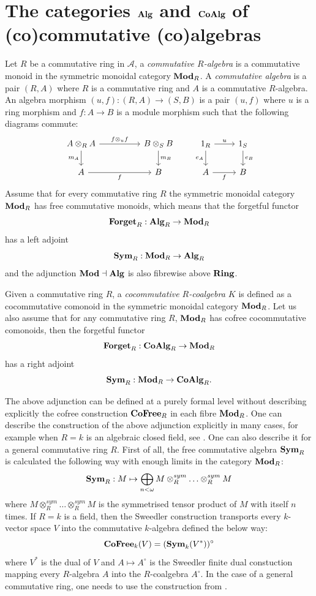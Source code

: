 \documentclass[8pt]{article}
\theoremstyle{definition}
\theoremstyle{definition}
\theoremstyle{definition}
\theoremstyle{definition}
\theoremstyle{definition}
\theoremstyle{definition}
\theoremstyle{definition}
\theoremstyle{definition}
\theoremstyle{definition}
\theoremstyle{definition}
\theoremstyle{definition}
\theoremstyle{definition}
\theoremstyle{definition}
\theoremstyle{definition}
\theoremstyle{question}
\begin{document}
\section{The categories ${\bf Alg}$ and ${\bf CoAlg}$ of (co)commutative (co)algebras}

Let $R$ be a commutative ring in $\mathcal{A}$, a \emph{commutative $R$-algebra} is a commutative monoid in the symmetric monoidal category
${\bf Mod}_R$. A \emph{commutative algebra} is a pair $(R, A)$ where $R$ is a commutative ring and $A$ is a commutative $R$-algebra.
An algebra morphism $(u, f) : (R, A) \to (S, B)$ is a pair $(u, f)$ where $u$ is a ring morphism and $f : A \to B$ is a module morphism such that the 
following diagrams commute:
\[
\begin{tikzcd}
  A \otimes_R A \ar[d, "m_A"'] \ar[rr, "f \otimes_u f"] && B \otimes_S B \ar[d, "m_B"] & 1_R \ar[r, "u"] \ar[d, "e_A"'] & 1_S \ar[d, "e_B"] \\
  A \ar[rr, "f"'] && B                                                                 & A \ar[r, "f"'] & B
\end{tikzcd}
\]
Assume that for every commutative ring $R$ the symmetric monoidal category ${\bf Mod}_R$ has free commutative monoids, which means that the forgetful 
functor
\[
{\bf Forget}_R : {\bf Alg}_R \to {\bf Mod}_R
\]
has a left adjoint
\[
{\bf Sym}_R : {\bf Mod}_R \to {\bf Alg}_R
\]
and the adjunction ${\bf Mod} \dashv {\bf Alg}$ is also fibrewise above ${\bf Ring}$.

Given a commutative ring $R$, a \emph{cocommutative $R$-coalgebra $K$} is defined as a cocommutative comonoid in the symmetric monoidal category
${\bf Mod}_R$. Let us also assume that for any commutative ring $R$, ${\bf Mod}_R$ has cofree cocommutative comonoids, then the forgetful functor
\[
{\bf Forget}_R : {\bf CoAlg}_R \to {\bf Mod}_R
\]
has a right adjoint  
\[
{\bf Sym}_R : {\bf Mod}_R \to {\bf CoAlg}_R.
\]
 
The above adjunction can be defined at a purely formal level without describing explicitly the cofree 
construction ${\bf CoFree}_R$ in each fibre ${\bf Mod}_R$. One can describe the construction of the above adjunction explicitly in many cases, for example when $R = k$ is an algebraic closed field, see \cite{murfet2015sweedler}.
One can also describe it for a general commutative ring $R$. First of all, the free commutative algebra ${\bf Sym}_R$ is calculated the following way
with enough limits in the category ${\bf Mod}_R$:
\[
{\bf Sym}_R : M \mapsto \bigoplus \limits_{n < \omega} M \otimes^{sym}_R \ldots \otimes^{sym}_R M
\]
where $M \otimes^{sym}_R \ldots \otimes^{sym}_R M$ is the symmetrised tensor product of $M$ with itself $n$ times. If $R = k$ is a field,
then the Sweedler construction transports every $k$-vector space $V$ into the commutative $k$-algebra defined the below way:
\[
{\bf CoFree}_k(V) = ({\bf Sym}_k(V^*))^{\circ}
\]
where $V^*$ is the dual of $V$ and $A \mapsto A^{\circ}$ is the Sweedler finite dual constuction mapping every $R$-algebra $A$ into the $R$-coalgebra $A^{\circ}$.
In the case of a general commutative ring, one needs to use the construction from \cite{porst2015formal}.
\end{document}
